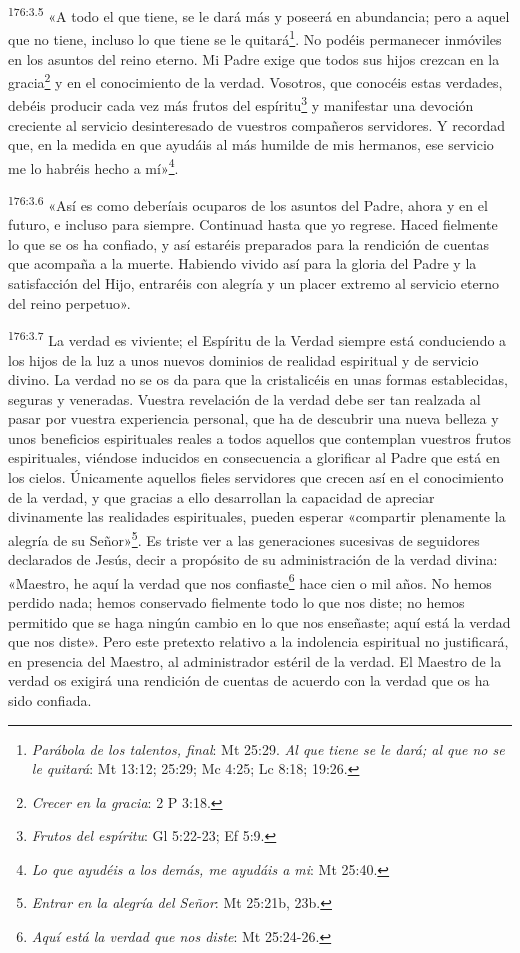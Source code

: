 \par
\textsuperscript{176:3.5} «A todo el que tiene, se le dará más y poseerá en abundancia; pero a aquel que no tiene, incluso lo que tiene se le quitará\footnote{\textit{Parábola de los talentos, final}: Mt 25:29. \textit{Al que tiene se le dará; al que no se le quitará}: Mt 13:12; 25:29; Mc 4:25; Lc 8:18; 19:26.}. No podéis permanecer inmóviles en los asuntos del reino eterno. Mi Padre exige que todos sus hijos crezcan en la gracia\footnote{\textit{Crecer en la gracia}: 2 P 3:18.} y en el conocimiento de la verdad. Vosotros, que conocéis estas verdades, debéis producir cada vez más frutos del espíritu\footnote{\textit{Frutos del espíritu}: Gl 5:22-23; Ef 5:9.} y manifestar una devoción creciente al servicio desinteresado de vuestros compañeros servidores. Y recordad que, en la medida en que ayudáis al más humilde de mis hermanos, ese servicio me lo habréis hecho a mí»\footnote{\textit{Lo que ayudéis a los demás, me ayudáis a mi}: Mt 25:40.}.

\par
\textsuperscript{176:3.6} «Así es como deberíais ocuparos de los asuntos del Padre, ahora y en el futuro, e incluso para siempre. Continuad hasta que yo regrese. Haced fielmente lo que se os ha confiado, y así estaréis preparados para la rendición de cuentas que acompaña a la muerte. Habiendo vivido así para la gloria del Padre y la satisfacción del Hijo, entraréis con alegría y un placer extremo al servicio eterno del reino perpetuo».

\par
\textsuperscript{176:3.7} La verdad es viviente; el Espíritu de la Verdad siempre está conduciendo a los hijos de la luz a unos nuevos dominios de realidad espiritual y de servicio divino. La verdad no se os da para que la cristalicéis en unas formas establecidas, seguras y veneradas. Vuestra revelación de la verdad debe ser tan realzada al pasar por vuestra experiencia personal, que ha de descubrir una nueva belleza y unos beneficios espirituales reales a todos aquellos que contemplan vuestros frutos espirituales, viéndose inducidos en consecuencia a glorificar al Padre que está en los cielos. Únicamente aquellos fieles servidores que crecen así en el conocimiento de la verdad, y que gracias a ello desarrollan la capacidad de apreciar divinamente las realidades espirituales, pueden esperar «compartir plenamente la alegría de su Señor»\footnote{\textit{Entrar en la alegría del Señor}: Mt 25:21b, 23b.}. Es triste ver a las generaciones sucesivas de seguidores declarados de Jesús, decir a propósito de su administración de la verdad divina: «Maestro, he aquí la verdad que nos confiaste\footnote{\textit{Aquí está la verdad que nos diste}: Mt 25:24-26.} hace cien o mil años. No hemos perdido nada; hemos conservado fielmente todo lo que nos diste; no hemos permitido que se haga ningún cambio en lo que nos enseñaste; aquí está la verdad que nos diste». Pero este pretexto relativo a la indolencia espiritual no justificará, en presencia del Maestro, al administrador estéril de la verdad. El Maestro de la verdad os exigirá una rendición de cuentas de acuerdo con la verdad que os ha sido confiada.

